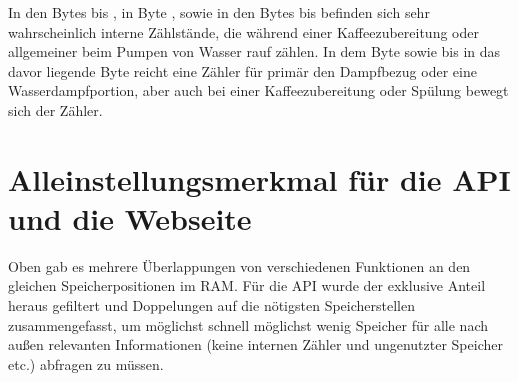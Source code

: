 In den Bytes  bis , in Byte , sowie in den Bytes  bis  befinden sich sehr wahrscheinlich interne Zählstände, die während einer Kaffeezubereitung oder allgemeiner beim Pumpen von Wasser rauf zählen.
In dem Byte  sowie bis in das davor liegende Byte  reicht eine Zähler für primär den Dampfbezug oder eine Wasserdampfportion, aber auch bei einer Kaffeezubereitung oder Spülung bewegt sich der Zähler.

\section{Alleinstellungsmerkmal für die API und die Webseite}
\todo
Oben gab es mehrere Überlappungen von verschiedenen Funktionen an den gleichen Speicherpositionen im \ac{RAM}.
Für die \ac{API} wurde der exklusive Anteil heraus gefiltert und Doppelungen auf die nötigsten Speicherstellen zusammengefasst, um möglichst schnell möglichst wenig Speicher für alle nach außen relevanten Informationen (keine internen Zähler und ungenutzter Speicher etc.) abfragen zu müssen.


